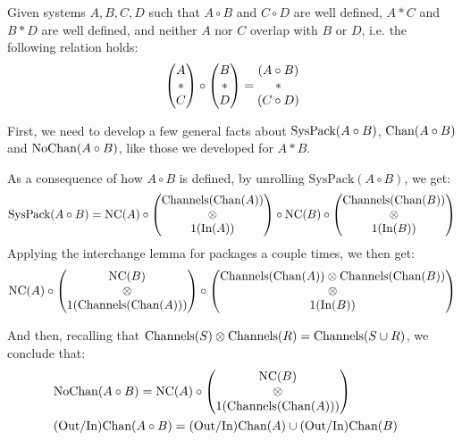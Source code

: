\begin{lemma}
\label{thm:interchange_system}
Given systems $A, B, C, D$ such that $A \circ B$ and $C \circ D$ are well defined,
$A * C$ and $B * D$ are well defined,
and neither $A$ nor $C$ overlap with $B$ or $D$, i.e.
the following relation holds:
$$
\begin{pmatrix} 
A\cr
*\cr
C\cr
\end{pmatrix} 
\circ
\begin{pmatrix} 
B\cr
*\cr
D\cr
\end{pmatrix} 
=
\begin{matrix} 
  (A \circ B)\cr
*\cr
  (C \circ D)\cr
\end{matrix} 
$$

First, we need to develop a few general facts about $\text{SysPack}(A \circ B)$, $\text{Chan}(A \circ B)$
and $\text{NoChan}(A \circ B)$, like those we developed for $A * B$.

As a consequence of how $A \circ B$ is defined, by unrolling $\text{SysPack}(A \circ B)$,
we get:
$$
  \text{SysPack}(A \circ B) =
  \text{NC}(A) \circ
  \begin{pmatrix}
    \text{Channels}(\text{Chan}(A))\cr
    \otimes\cr
    1(\text{In}(A))
  \end{pmatrix}
  \circ \text{NC}(B) \circ
  \begin{pmatrix}
    \text{Channels}(\text{Chan}(B))\cr
    \otimes\cr
    1(\text{In}(B))
  \end{pmatrix}
$$
Applying the interchange lemma for packages a couple times, we then get:
$$
  \text{NC}(A) \circ
  \begin{pmatrix}
    \text{NC}(B)\cr
    \otimes\cr
    1(\text{Channels}(\text{Chan}(A)))
  \end{pmatrix}
  \circ
  \begin{pmatrix}
    \text{Channels}(\text{Chan}(A)) \otimes \text{Channels}(\text{Chan}(B))\cr
    \otimes\cr
    1(\text{In}(B))
  \end{pmatrix}
$$

And then, recalling
that $\text{Channels}(S) \otimes \text{Channels}(R) = \text{Channels}(S \cup R)$,
we conclude that:
$$
\begin{aligned}
  &\text{NoChan}(A \circ B) =
  \text{NC}(A) \circ
  \begin{pmatrix}
    \text{NC}(B)\cr
    \otimes\cr
    1(\text{Channels}(\text{Chan}(A)))
  \end{pmatrix}
  \cr
  &\text{(Out/In)Chan}(A \circ B) = \text{(Out/In)Chan}(A) \cup \text{(Out/In)Chan}(B)\cr
\end{aligned}
$$


\end{lemma}
